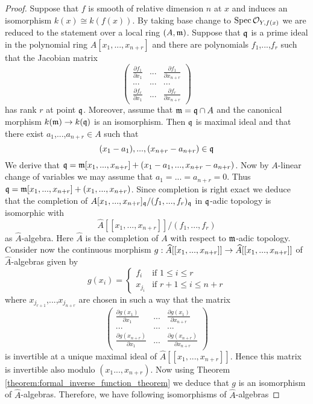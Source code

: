 \begin{proof}
Suppose that $f$ is smooth of relative dimension $n$ at $x$ and induces an isomorphism $k(x)\cong k(f(x))$. By taking base change to $\mathrm{Spec}\, {\mathcal O}_{Y,f(x)}$ we are reduced to the statement over a local ring $(A,\mathfrak{m})$. Suppose that $\mathfrak{q}$ is a prime ideal in the polynomial ring $A[x_1,...,x_{n+r}]$ and there are polynomials $f_1$,...,$f_r$ such that the Jacobian matrix
$$\left( \begin{array}{ccc}
\frac{\partial f_1}{\partial x_1} & ... & \frac{\partial f_1}{\partial x_{n+r}} \\
... &...  &...  \\
\frac{\partial f_r}{\partial x_{1}} &...  & \frac{\partial f_r}{\partial x_{n+r}}\end{array} \right)$$
has rank $r$ at point $\mathfrak{q}$. Moreover, assume that $\mathfrak{m} = \mathfrak{q} \cap A$ and the canonical morphism $k(\mathfrak{m})\rightarrow k(\mathfrak{q})$ is an isomorphism. Then $\mathfrak{q}$ is maximal ideal and that there exist $a_1$,...,$a_{n+r}\in A$ such that
$$(x_1-a_1),...,(x_{n+r}-a_{n+r})\in \mathfrak{q}$$
We derive that $\mathfrak{q}=\mathfrak{m}[x_1,...,x_{n+r}]+(x_1-a_1,...,x_{n+r}-a_{n+r})$. Now by $A$-linear change of variables we may assume that $a_1 = ... = a_{n+r} = 0$. Thus $\mathfrak{q} = \mathfrak{m}[x_1,...,x_{n+r}]+(x_1,...,x_{n+r})$. Since completion is right exact we deduce that the completion of $A[x_1,...,x_{n+r}]_{\mathfrak{q}}/(f_1,...,f_r)_{\mathfrak{q}}$ in $\mathfrak{q}$-adic topology is isomorphic with
$$\widehat{A}[[x_1,...,x_{n+r}]]/(f_1,...,f_r)$$
as $\widehat{A}$-algebra. Here $\widehat{A}$ is the completion of $A$ with respect to $\mathfrak{m}$-adic topology. Consider now the continuous morphism $g:\widehat{A}[[x_1,...,x_{n+r}]] \rightarrow \widehat{A}[[x_1,...,x_{n+r}]]$ of $\widehat{A}$-algebras given by
$$g(x_i)=\begin{cases} 
f_i &\mbox{if } 1\leq i\leq r\\
x_{j_i} &\mbox{if } r+1\leq i\leq n+r
\end{cases}$$
where $x_{j_{r+1}}$,...,$x_{j_{n+r}}$ are chosen in such a way that the matrix
$$\left( \begin{array}{ccc}
\frac{\partial g(x_1)}{\partial x_1} & ... & \frac{\partial g(x_1)}{\partial x_{n+r}} \\
... &...  &...  \\
\frac{\partial g(x_{n+r})}{\partial x_1} &...  & \frac{\partial g(x_{n+r})}{\partial x_{n+r}}\end{array} \right)$$
is invertible at a unique maximal ideal of $\widehat{A}[[x_1,...,x_{n+r}]]$. Hence this matrix is invertible also modulo $(x_1...,x_{n+r})$. Now using Theorem \ref{theorem:formal_inverse_function_theorem} we deduce that $g$ is an isomorphism of $\widehat{A}$-algebras. Therefore, we have following isomorphisms of $\widehat{A}$-algebras

\end{proof}

